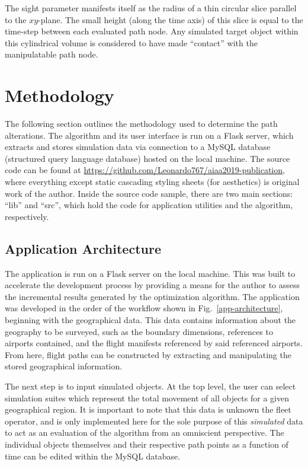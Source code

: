\documentclass[conf]{new-aiaa}
\begin{document}
The sight parameter manifests itself as the radius of a thin circular slice parallel to the $xy$-plane. The small height (along the time axis) of this slice is equal to the time-step between each evaluated path node. Any simulated target object within this cylindrical volume is considered to have made ``contact'' with the manipulatable path node.





\section{Methodology}

The following section outlines the methodology used to determine the path alterations. The algorithm and its user interface is run on a Flask server, which extracts and stores simulation data via connection to a MySQL database (structured query language database) hosted on the local machine. The source code can be found at \url{https://github.com/Leonardo767/aiaa2019-publication}, where everything except static cascading styling sheets (for aesthetics) is original work of the author. Inside the source code sample, there are two main sections: ``lib'' and ``src'', which hold the code for application utilities and the algorithm, respectively.

\subsection{Application Architecture}
The application is run on a Flask server on the local machine. This was built to accelerate the development process by providing a means for the author to assess the incremental results generated by the optimization algorithm. The application was developed in the order of the workflow shown in Fig.~\ref{app-architecture}, beginning with the geographical data. This data contains information about the geography to be surveyed, such as the boundary dimensions, references to airports contained, and the  flight manifests referenced by said referenced airports. From here, flight paths can be constructed by extracting and manipulating the stored geographical information.

The next step is to input simulated objects. At the top level, the user can select simulation suites which represent the total movement of all objects for a given geographical region. It is important to note that this data is unknown the fleet operator, and is only implemented here for the sole purpose of this \emph{simulated} data to act as an evaluation of the algorithm from an omniscient perspective. The individual objects themselves and their respective path points as a function of time can be edited within the MySQL database.
\end{document}

